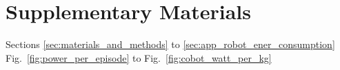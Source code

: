 \documentclass[12pt]{article}
\begin{document}
\section*{Supplementary Materials}
Sections \ref{sec:materials_and_methods} to \ref{sec:app_robot_ener_consumption}\\
Fig.~\ref{fig:power_per_episode} to Fig.~\ref{fig:cobot_watt_per_kg}
\end{document}
